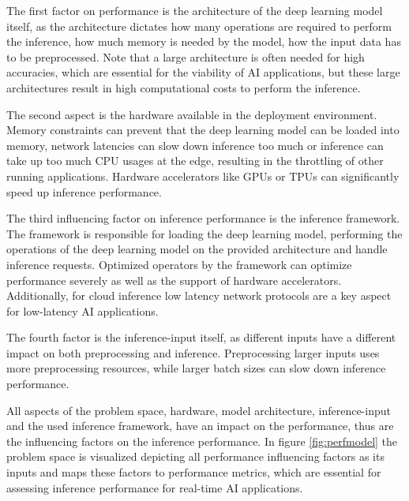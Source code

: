 The first factor on performance is the architecture of the deep learning model itself, as the architecture dictates how many operations are required to perform the inference, how much memory is needed by the model, how the input data has to be preprocessed.
Note that a large architecture is often needed for high accuracies, which are essential for the viability of AI applications, but these large architectures result in high computational costs to perform the inference.

The second aspect is the hardware available in the deployment environment. 
Memory constraints can prevent that the deep learning model can be loaded into memory, network latencies can slow down inference too much or inference can take up too much CPU usages at the edge, resulting in the throttling of other running applications.
Hardware accelerators like GPUs or TPUs can significantly speed up inference performance.

The third influencing factor on inference performance is the inference framework. 
The framework is responsible for loading the deep learning model, performing the operations of the deep learning model on the provided architecture and handle inference requests.
Optimized operators by the framework can optimize performance severely as well as the support of hardware accelerators.
Additionally, for cloud inference low latency network protocols are a key aspect for low-latency AI applications.

The fourth factor is the inference-input itself, as different inputs have a different impact on both preprocessing and inference. 
Preprocessing larger inputs uses more preprocessing resources, while larger batch sizes can slow down inference performance.

All aspects of the problem space, hardware, model architecture, inference-input and the used inference framework, have an impact on the performance, thus are the influencing factors on the inference performance.
In figure \ref{fig:perfmodel} the problem space is visualized depicting all performance influencing factors as its inputs and maps these factors to performance metrics, which are essential for assessing inference performance for real-time AI applications.

